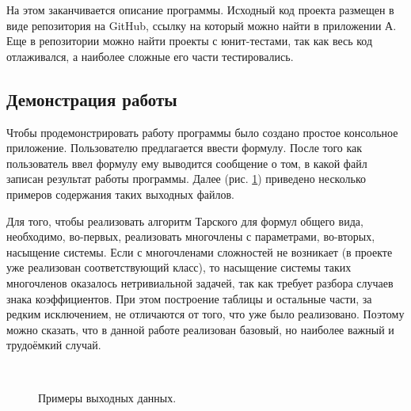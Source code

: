 На этом заканчивается описание программы. Исходный код проекта размещен в виде репозитория на GitHub, ссылку на который можно найти в приложении А. Еще в репозитории можно найти проекты с юнит-тестами, так как весь код отлаживался, а наиболее сложные его части тестировались.

\subsection{Демонстрация работы}

Чтобы продемонстрировать работу программы было создано простое консольное приложение. Пользователю предлагается ввести формулу. После того как пользователь ввел формулу ему выводится сообщение о том, в какой файл записан результат работы программы. Далее (рис. \ref{fig:примеры}) приведено несколько примеров содержания таких выходных файлов.

Для того, чтобы реализовать алгоритм Тарского для формул общего вида, необходимо, во-первых, реализовать многочлены с параметрами, во-вторых, насыщение системы. Если с многочленами сложностей не возникает (в проекте уже реализован соответствующий класс), то насыщение системы таких многочленов оказалось нетривиальной задачей, так как требует разбора случаев знака коэффициентов. При этом построение таблицы и остальные части, за редким исключением, не отличаются от того, что уже было реализовано. Поэтому можно сказать, что в данной работе реализован базовый, но наиболее важный и трудоёмкий случай.


\begin{figure}[ht]
    \begin{minipage}[ht]{0.349\linewidth}
    \end{minipage}
    \hfill
    \begin{minipage}[ht]{0.65\linewidth}
    \end{minipage}
    \\
    \begin{center}
        \begin{minipage}[ht]{0.8\linewidth}
        \end{minipage} 
    \end{center}
    \caption{Примеры выходных данных.}  
    \label{fig:примеры}
\end{figure}